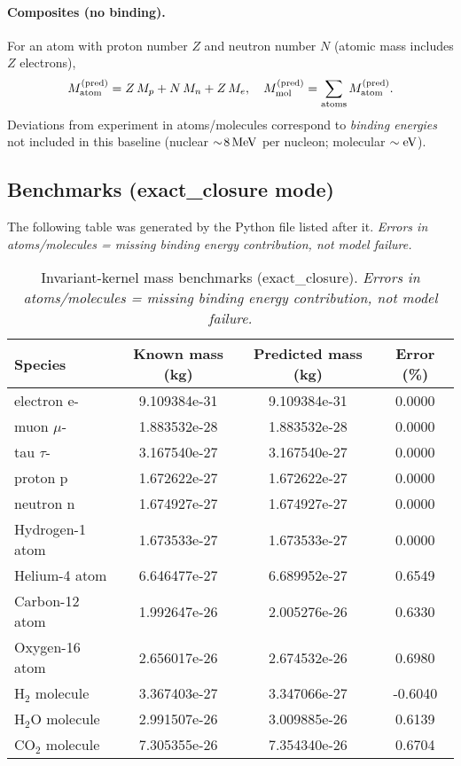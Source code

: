 \documentclass[11pt]{article}
\begin{document}
\paragraph{Composites (no binding).}
    For an atom with proton number $Z$ and neutron number $N$ (atomic mass includes $Z$ electrons),
    \[
        M_{\rm atom}^{(\rm pred)} = Z\,M_p+N\,M_n+Z\,M_e,\quad
        M_{\rm mol}^{(\rm pred)}=\sum_{\text{atoms}}M_{\rm atom}^{(\rm pred)}.
    \]
    Deviations from experiment in atoms/molecules correspond to \emph{binding energies} not included in this baseline (nuclear $\sim\!8\,{\rm MeV}$ per nucleon; molecular $\sim{\rm eV}$).

\subsection{Benchmarks (exact\_closure mode)}
\label{sec:benchmarks-exact-closure}
The following table was generated by the Python file listed after it.
\emph{Errors in atoms/molecules = missing binding energy contribution, not model failure.}

\begin{table}[H]
\centering
\caption{Invariant-kernel mass benchmarks (exact\_closure). \emph{Errors in atoms/molecules = missing binding energy contribution, not model failure.}}
\begin{tabular}{lccc}
\toprule
Species & Known mass (kg) & Predicted mass (kg) & Error (\%)\\
\midrule
electron e- & 9.109384e-31 & 9.109384e-31 & 0.0000\\
muon $\mu$- & 1.883532e-28 & 1.883532e-28 & 0.0000\\
tau $\tau$- & 3.167540e-27 & 3.167540e-27 & 0.0000\\
proton p & 1.672622e-27 & 1.672622e-27 & 0.0000\\
neutron n & 1.674927e-27 & 1.674927e-27 & 0.0000\\
Hydrogen-1 atom & 1.673533e-27 & 1.673533e-27 & 0.0000\\
Helium-4 atom & 6.646477e-27 & 6.689952e-27 & 0.6549\\
Carbon-12 atom & 1.992647e-26 & 2.005276e-26 & 0.6330\\
Oxygen-16 atom & 2.656017e-26 & 2.674532e-26 & 0.6980\\
H$_2$ molecule & 3.367403e-27 & 3.347066e-27 & -0.6040\\
H$_2$O molecule & 2.991507e-26 & 3.009885e-26 & 0.6139\\
CO$_2$ molecule & 7.305355e-26 & 7.354340e-26 & 0.6704\\
\bottomrule
\end{tabular}\label{tab:benchmarks-exact-closure}
\end{table}
\end{document}
